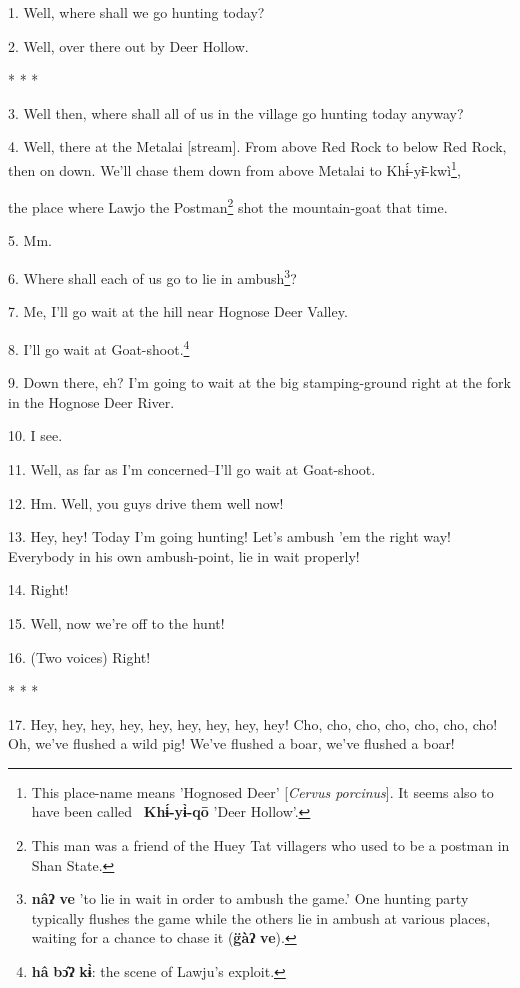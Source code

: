 \setcounter{footnote}{0}

1. Well, where shall we go hunting today?

2. Well, over there out by Deer Hollow.

\begin{center}
* * *
\end{center}

3. Well then, where shall all of us in the village go hunting today anyway?

4. Well, there at the Metalai [stream]. From above Red Rock to below Red Rock,
then on down. We'll chase them down from above Metalai to Khɨ́-yɨ̄-kwì\footnote{This place-name means 'Hognosed Deer' [\textit{Cervus porcinus}]. It seems also to have been called ~\textbf{Khɨ́-yɨ̀-qō} 'Deer Hollow'.},

the place where Lawjo the Postman\footnote{This man was a friend of the Huey Tat villagers who used to be a postman in Shan State.} shot the mountain-goat that time.

5. Mm.

6. Where shall each of us go to lie in ambush\footnote{\textbf{nâʔ} \textbf{ve} 'to lie in wait in order to ambush the game.' One hunting party typically flushes the game while the others lie in ambush at various places, waiting for a chance to chase it (\textbf{g̈àʔ} \textbf{ve}).}?

7. Me, I'll go wait at the hill near Hognose Deer Valley.

8. I'll go wait at Goat-shoot.\footnote{\textbf{hâ} \textbf{bɔ̂ʔ} \textbf{kɨ̀}: the scene of Lawju's exploit.}

9. Down there, eh? I'm going to wait at the big stamping-ground right at the fork
in the Hognose Deer River.

10. I see.

11. Well, as far as I'm concerned--I'll go wait at Goat-shoot.

12. Hm. Well, you guys drive them well now!

13. Hey, hey! Today I'm going hunting! Let's ambush 'em the right way! Everybody
in his own ambush-point, lie in wait properly!

14. Right!

15. Well, now we're off to the hunt!

16. (Two voices) Right!

\begin{center}
* * *
\end{center}

17. Hey, hey, hey, hey, hey, hey, hey, hey, hey! Cho, cho, cho, cho, cho, cho,
cho! Oh, we've flushed a wild pig! We've flushed a boar, we've flushed a boar!

